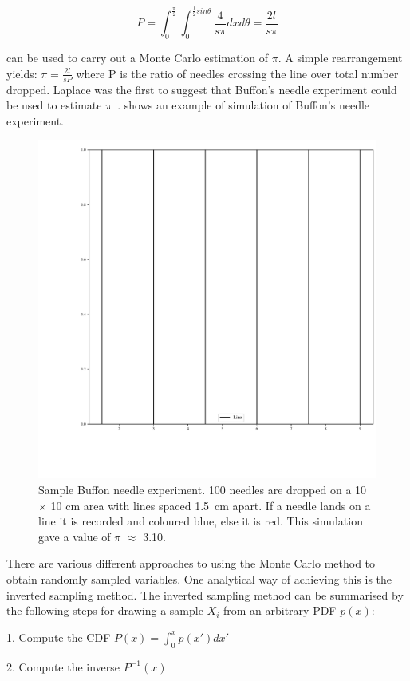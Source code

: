 \begin{equation}
P=\int_0^{\frac{\pi}{2}}\int_0^{\frac{l}{2}sin\theta}\frac{4}{s\pi}dx d\theta = \frac{2 l}{s \pi}\label{eqn:buffon}
\end{equation}


 can be used to carry out a Monte Carlo estimation of $\pi$. A simple rearrangement yields: $\pi = \tfrac{2l}{sP}$ where P is the ratio of needles crossing the line over total number dropped. Laplace was the first to suggest that Buffon's needle experiment could be used to estimate $\pi$~\cite{beckmann2015history}.  shows an example of simulation of Buffon's needle experiment.

\begin{figure}[!htb]
\centering
\includegraphics[width=.65\textwidth]{buffon.pdf}
\caption{Sample Buffon needle experiment. 100 needles are dropped on a 10 $\times$ 10 cm area with lines spaced 1.5~cm apart. If a needle lands on a line it is recorded and coloured blue, else it is red. This simulation gave a value of $\pi$ $\approx$ 3.10.}
\label{fig:buffon-needle}
\end{figure}

There are various different approaches to using the Monte Carlo method to obtain randomly sampled variables.
One analytical way of achieving this is the inverted sampling method.
The inverted sampling method can be summarised by the following steps for drawing a sample $X_i$ from an arbitrary PDF $p(x)$:

\medskip

1. Compute the CDF $P(x)=\int^{x}_{0}p(x')dx'$

2. Compute the inverse $P^{-1}(x)$


